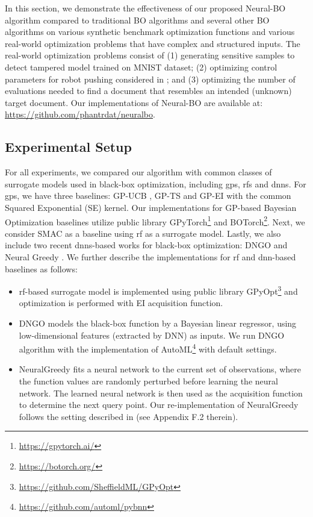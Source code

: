 In this section, we demonstrate the effectiveness of our proposed Neural-BO algorithm compared to traditional BO algorithms and several other BO algorithms on various synthetic benchmark optimization functions and various real-world optimization problems that have complex and structured inputs. The real-world optimization problems consist of (1) generating sensitive samples to detect tampered model trained on MNIST \citep{lecun-mnisthandwrittendigit-2010} dataset; (2) optimizing control parameters for robot pushing considered in \citet{wang2017max}; and (3) optimizing the number of evaluations needed to find a document that resembles an intended (unknown) target document. Our implementations of Neural-BO are available at: \url{https://github.com/phantrdat/neuralbo}.
\subsection{Experimental Setup}
For all experiments, we compared our algorithm with common classes of surrogate models used in black-box optimization, including \acp{gp}, \acp{rf} and \acp{dnn}. For \acp{gp}, we have three baselines: GP-UCB \citep{srinivas2009gaussian}, GP-TS \citep{chowdhury2017kernelized} and GP-EI \citep{jones1998efficient} with the common Squared Exponential (SE) kernel. Our implementations for GP-based Bayesian Optimization baselines utilize public library GPyTorch\footnote{\url{https://gpytorch.ai/}} and BOTorch\footnote{\url{https://botorch.org/}}. Next, we consider SMAC \citep{hutter2011sequential} as a baseline using \ac{rf} as a surrogate model. Lastly, we also include two recent \acp{dnn}-based works for black-box optimization: DNGO \citep{snoek2015scalable} and Neural Greedy \citep{pariagreedy}. We further describe the implementations for \ac{rf} and \ac{dnn}-based baselines as follows: 
\begin{itemize}
    \item \ac{rf}-based surrogate model is implemented using public library GPyOpt\footnote{\url{https://github.com/SheffieldML/GPyOpt}} and optimization is performed with EI acquisition function.
    \item DNGO \citep{snoek2015scalable} models the black-box function by a Bayesian linear regressor, using low-dimensional features (extracted by DNN) as inputs. We run DNGO algorithm with the implementation of AutoML\footnote{\url{https://github.com/automl/pybnn}} with default settings. 
    \item NeuralGreedy \citep{pariagreedy} fits a neural network to the current set of observations, where the function values are randomly perturbed before learning the neural network. The learned neural network is then used as the acquisition function to determine the next query point. Our re-implementation of NeuralGreedy follows the setting described in \citet{pariagreedy} (see Appendix F.2 therein).
\end{itemize}
 

